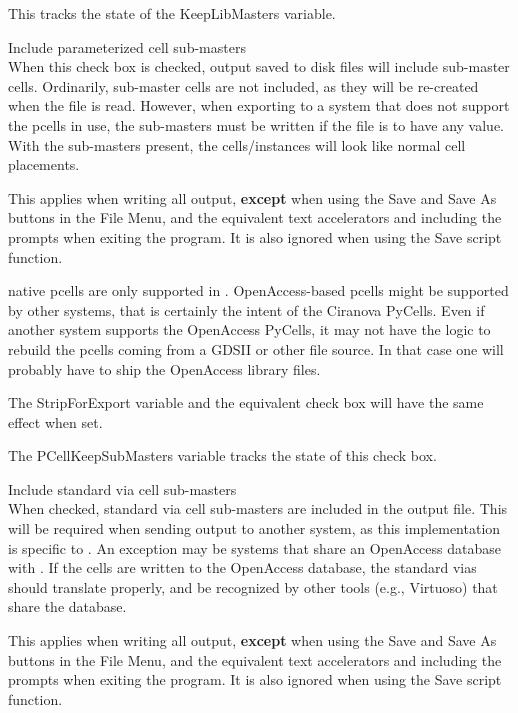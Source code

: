 \begin{description}
This tracks the state of the {\et KeepLibMasters} variable.

\item{\cb Include parameterized cell sub-masters}\\
When this check box is checked, output saved to disk files will
include sub-master cells.  Ordinarily, sub-master cells are not
included, as they will be re-created when the file is read.  However,
when exporting to a system that does not support the pcells in use,
the sub-masters must be written if the file is to have any value. 
With the sub-masters present, the cells/instances will look like
normal cell placements.

This applies when writing all output, {\bf except} when using the {\cb
Save} and {\cb Save As} buttons in the {\cb File Menu}, and the
equivalent text accelerators and including the prompts when exiting
the program.  It is also ignored when using the {\vt Save} script
function.

{\Xic} native pcells are only supported in {\Xic}.  OpenAccess-based
pcells might be supported by other systems, that is certainly the
intent of the Ciranova PyCells.  Even if another system supports the
OpenAccess PyCells, it may not have the logic to rebuild the pcells
coming from a GDSII or other file source.  In that case one will
probably have to ship the OpenAccess library files.

The {\et StripForExport} variable and the equivalent check box will
have the same effect when set.

The {\et PCellKeepSubMasters} variable tracks the state of this check
box.

\item{\cb Include standard via cell sub-masters}\\
When checked, standard via cell sub-masters are included in the output
file.  This will be required when sending output to another system, as
this implementation is specific to {\Xic}.
An exception may be systems that share an OpenAccess database with
{\Xic}.  If the cells are written to the OpenAccess database, the
standard vias should translate properly, and be recognized by other
tools (e.g., Virtuoso) that share the database.

This applies when writing all output, {\bf except} when using the {\cb
Save} and {\cb Save As} buttons in the {\cb File Menu}, and the
equivalent text accelerators and including the prompts when exiting
the program.  It is also ignored when using the {\vt Save} script
function.


\end{description}
